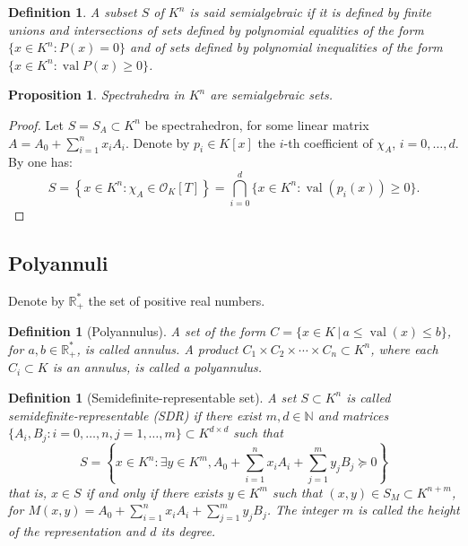 \documentclass[a4paper,oneside,11pt]{article}
\newtheorem{proposition}[theorem]{Proposition}
\newtheorem{definition}[theorem]{Definition}
\newcommand{\R}{\mathbb{R}} %
\newcommand{\N}{\mathbb{N}} %
\newcommand{\corentin}[1]{{\color{red} #1}} %
\DeclareMathOperator{\val}{val}
\newcommand{\OK}{\mathcal{O}_K}
\begin{document}
\begin{definition}
  A subset $S$ of $K^n$ is said \emph{semialgebraic} if it is defined by finite unions and intersections of sets defined by polynomial equalities of the form $\{ x \in K^n  : P( x) = 0 \}$ and of sets defined by polynomial inequalities of the form $\{ x\in K^n : \val P(x) \geq 0 \}$.
\end{definition}

\begin{proposition}
  Spectrahedra in $K^n$ are semialgebraic sets. 
\end{proposition}

\begin{proof}
  Let $S = S_A \subset K^n$ be spectrahedron, for some linear matrix $A = A_0+\sum_{i=1}^n x_i A_i$. 
  Denote by $p_i \in K[x]$ the $i$-th coefficient of $\chi_{A}$, $i=0,\ldots,d$.
  By  one has:
  $$
  S = \left\{x \in K^n : \chi_{A} \in \OK[T]\right\}
  = \bigcap_{i=0}^d \{x \in K^n : \val(p_i(x)) \geq 0\}.
  $$
\end{proof}


\subsection{Polyannuli}

Denote by $\R^*_+$ the set of positive real numbers.

\begin{definition}[Polyannulus]\label{def_annuli}
  A set of the form $C = \{x \in K \,|\, a \le \val(x) \le b\}$, for $a,b \in \R^*_+$,
  is called \emph{annulus}. A product $C_1 \times C_2 \times \cdots \times C_n \subset K^n$,
  where each $C_i \subset K$ is an annulus, is called a \emph{polyannulus}.
\end{definition}

\begin{definition}[Semidefinite-representable set]\label{def_semi_def_rep_set}
  A set $S \subset K^n$ is called \emph{semide\-fi\-nite-re\-pre\-sen\-ta\-ble (SDR)} if there exist $m,d \in \N$ and
  matrices $\{A_i,B_j : i = 0, \ldots, n, j = 1, \ldots, m\} \subset K^{d \times d}$ such that
  $$
  S = \left\{x \in K^n : \exists y \in K^m, A_0+\sum_{i=1}^n x_iA_i + \sum_{j=1}^m y_jB_j \succeq 0\right\}
  $$
  that is, $x \in S$ if and only if there exists $y \in K^m$ such that
  $(x,y) \in S_M \subset K^{n+m}$, for $M(x,y) = A_0+\sum_{i=1}^n x_iA_i + \sum_{j=1}^m y_jB_j$.
  The integer $m$ is called the \emph{height} of the representation and $d$ its \emph{degree}.
\end{definition}
\end{document}
